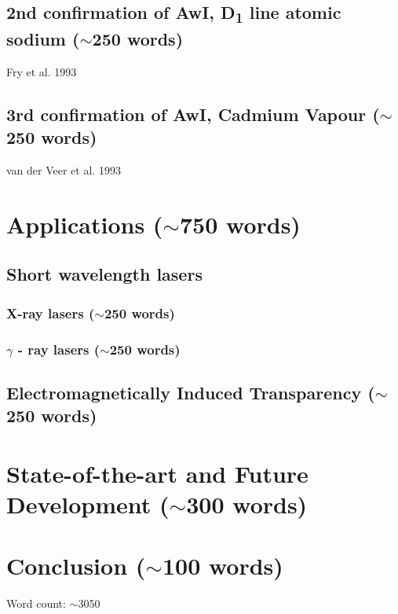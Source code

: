 \documentclass{article}
\begin{document}
\subsection{2nd confirmation of AwI, D\textsubscript{1} line atomic sodium ($\sim$250 words)}
Fry et al. 1993 \cite{PhysRevLett.70.3235}
\subsection{3rd confirmation of AwI, Cadmium Vapour ($\sim$250 words)}
van der Veer et al. 1993 \cite{PhysRevLett.70.3243}

\section{Applications ($\sim$750 words)}
\subsection{Short wavelength lasers}
\subsubsection{X-ray lasers ($\sim$250 words)}
\subsubsection{$\gamma$ - ray lasers ($\sim$250 words)}
\subsection{Electromagnetically Induced Transparency ($\sim$250 words)}

\section{State-of-the-art and Future Development ($\sim$300 words)}

\section{Conclusion ($\sim$100 words)}

Word count: $\sim$3050
\end{document}
